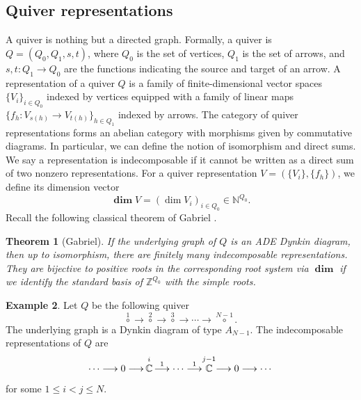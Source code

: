 \documentclass[12pt,reqno]{amsart}
\numberwithin{equation}{section}
\newtheorem{theorem}{Theorem}[section]
\theoremstyle{definition}
\newtheorem{example}[theorem]{Example}
\begin{document}
\def\ddim{\operatorname{\mathbf{dim}}}
\def\vv{\mathbf{v}}
\def\Hom{\operatorname{Hom}}
\def\D#1#2#3#4{\begin{matrix}
{\!\!\xymatrix@!=0pc{
\ar@{}[d]|<<{\phantom{A}}="uu"
\ar@{}[d]|>>>{\phantom{A}}="dd"
\ar"uu";[r]^{#3}
\ar"dd";[dr]_{#4}
&\makebox[0pc][l]{{$#1$}}\\
&\makebox[0pc][l]{{$#2$}}}}\\
\end{matrix}}



\subsection{Quiver representations}
A quiver is nothing but a directed graph. 
Formally, a quiver is $Q=(Q_0,Q_1,s,t)$,  
where $Q_0$ is the set of vertices, $Q_1$ is the set of arrows, and $s,t:Q_1\to Q_0$ are the functions indicating the source and target of an arrow. 
A representation of a quiver $Q$ is a family of finite-dimensional vector spaces $\{V_i\}_{i\in Q_0}$ indexed by vertices equipped with a family of linear maps $\{f_{h}:V_{s(h)}\to V_{t(h)}\}_{h\in Q_1}$ indexed by arrows. 
The category of quiver representations forms an abelian category with morphisms given by commutative diagrams. 
In particular, we can define the notion of isomorphism and direct sums. 
We say a representation is indecomposable if it cannot be written as a direct sum of two nonzero representations. 
For a quiver representation $V=(\{V_i\},\{f_{h}\})$, we define its dimension vector 
$$\ddim V = (\dim V_i)_{i\in Q_0}\in \mathbb{N}^{Q_0}. $$
Recall the following classical theorem  of Gabriel \cite{Gabriel}. 

\begin{theorem}[Gabriel]\label{Gabriel}
If the underlying graph of $Q$ is an ADE Dynkin diagram, then up to isomorphism, there are finitely many indecomposable representations. 
They are bijective to positive roots in the corresponding root system via $\ddim$ if we identify the standard basis of $\mathbb{Z}^{Q_0}$ with the simple roots. 
\end{theorem}


\begin{example}\label{eg:QuiverA}
Let $Q$ be the following quiver 
$$
\stackrel{1}\circ 
\longrightarrow 
\stackrel{2}\circ 
\longrightarrow 
\stackrel{3}\circ 
\longrightarrow \cdots 
\longrightarrow 
\stackrel{\!\!\!\!\!\!N-1\!\!\!\!\!\!}\circ.
$$
The underlying graph is a Dynkin diagram of type $A_{N-1}$. 
The indecomposable representations of $Q$ are 
$$\cdots\longrightarrow 
0
\longrightarrow 
\stackrel{i}{\vphantom{\tfrac12}
\,\mathbb{C}\,}
\stackrel{1}\longrightarrow 
\cdots 
\stackrel{1}\longrightarrow 
\stackrel{j-1}{\vphantom{\tfrac12}
\,\mathbb{C}\,}
\longrightarrow 0\longrightarrow 
\cdots$$
for some $1\leq i<j\leq N$. 
\end{example}
\end{document}
